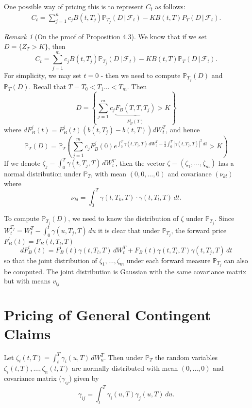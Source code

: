 \documentclass[10pt, oneside, reqno]{amsbook}
\theoremstyle{plain}%
\theoremstyle{definition}
\theoremstyle{remark}
\newtheorem*{rem}{Remark}
\newcommand{\given}{ \, | \,}
\newcommand{\sigf}{\mathcal{F}}
\renewcommand{\P}{\mathbb{P}}
\numberwithin{equation}{chapter}
\begin{document}
One possible way of pricing this is to represent $C_t$ as follows: \begin{align*}
    C_t = \sum_{j=1}^n c_j B(t, T_j) \P_{T_j}(D \given \sigf_t) - K B(t, T)P_T(D \given \sigf_t).
\end{align*}

\begin{rem}[On the proof of Proposition 4.3]
    We know that if we set $D = \{ Z_T > K \}$, then \[
        C_t = \sum_{j=1}^m c_j B(t, T_j) \P_{T_j}(D \given \sigf_t) - K B(t, T) \P_T(D \given \sigf_t).
    \]
    For simplicity, we may set $t = 0$ - then we need to compute $\P_{T_j}(D)$ and $\P_T(D)$.  Recall that $T = T_0 < T_1 \dots < T_m$.  Then \[
        D = \left\{ \sum_{j=1}^m c_j \underbrace{F_B(T, T, T_j)}_{F^j_B(T)} > K \right\}
    \]       where $dF^j_B(t) = F^j_B(t)(b(t, T_j) - b(t, T)) dW^T_t$, and hence \[
        \P_T(D) = \P_T \left( \sum_{j=1}^m c_j F^j_B(0) e^{\int_0^T \gamma(t, T_j, T) \, dW^T_t - \frac{1}{2} \int_0^T \left| \gamma(t, T_j, T) \right|^2 \, dt} > K \right)
    \]
If we denote $\zeta_j = \int_0^T \gamma(t, T_j, T) \, dW^T_t$, then the vector $\zeta = (\zeta_1, \dots, \zeta_m)$ has a normal distribution under $\P_T$, with mean $(0, 0, \dots, 0)$ and covariance $(\nu_{kl})$ where \[
    \nu_{kl} = \int_0^T \gamma(t, T_k, T) \cdot \gamma(t, T_l, T) \, dt.
\]

To compute $\P_{T_j}(D)$, we need to know the distribution of $\zeta$ under $\P_{T_j}$.  Since $W^{T_j}_t = W^T_t - \int_0^t \gamma(u, T_j, T) \, du$ it is clear that under $\P_{T_j}$, the forward price $F^l_B(t) = F_B(t, T_l, T)$ \[
    dF^l_B(t) = F^l_B(t) \gamma(t, T_l, T) \, dW^T_t + F_B(t) \gamma(t, T_l, T) \gamma(t, T_j, T) \, dt
\] so that the joint distribution of $\zeta_1, \dots, \zeta_m$ under each forward measure $\P_{T_j}$ can also be computed.  The joint distribution is Gaussian with the same covariance matrix but with means $v_{lj}$

\end{rem}

\section{Pricing of General Contingent Claims} %
\label{sec:pricing_of_general_contingent_claims}
Let $\zeta_i(t, T) = \int_t^T \gamma_i(u, T) \, dW^T_u$.  Then under $\P_T$ the random variables $\zeta_i(t, T), \dots, \zeta_n(t, T)$ are normally distributed with mean $(0, \dots, 0)$ and covariance matrix ($\gamma_{ij}$) given by \[
    \gamma_{ij} = \int_t^T \gamma_i(u, T) \gamma_j(u, T) \, du.
\]
\end{document}

